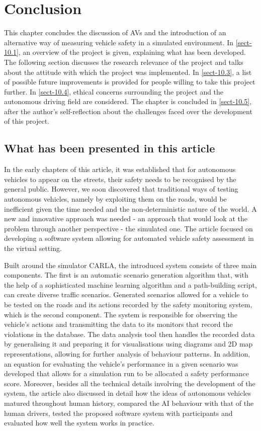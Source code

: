 \chapter{Conclusion} \label{chap:ten}
This chapter concludes the discussion of AVs and the introduction of an alternative way of measuring vehicle safety in a simulated environment. In \autoref{sect-10.1}, an overview of the project is given, explaining what has been developed. The following section discusses the research relevance of the project and talks about the attitude with which the project was implemented. In \autoref{sect-10.3}, a list of possible future improvements is provided for people willing to take this project further. In \autoref{sect-10.4}, ethical concerns surrounding the project and the autonomous driving field are considered. The chapter is concluded in \autoref{sect-10.5}, after the author's self-reflection about the challenges faced over the development of this project.

\section{What has been presented in this article} \label{sect-10.1}
In the early chapters of this article, it was established that for autonomous vehicles to appear on the streets, their safety needs to be recognised by the general public. However, we soon discovered that traditional ways of testing autonomous vehicles, namely by exploiting them on the roads, would be inefficient given the time needed and the non-deterministic nature of the world. A new and innovative approach was needed - an approach that would look at the problem through another perspective - the simulated one. The article focused on developing a software system allowing for automated vehicle safety assessment in the virtual setting. 

Built around the simulator CARLA, the introduced system consists of three main components. The first is an automatic scenario generation algorithm that, with the help of a sophisticated machine learning algorithm and a path-building script, can create diverse traffic scenarios. Generated scenarios allowed for a vehicle to be tested on the roads and its actions recorded by the safety monitoring system, which is the second component. The system is responsible for observing the vehicle's actions and transmitting the data to its monitors that record the violations in the database. The data analysis tool then handles the recorded data by generalising it and preparing it for visualisations using diagrams and 2D map representations, allowing for further analysis of behaviour patterns. In addition, an equation for evaluating the vehicle's performance in a given scenario was developed that allows for a simulation run to be allocated a safety performance score. Moreover, besides all the technical details involving the development of the system, the article also discussed in detail how the ideas of autonomous vehicles matured throughout human history, compared the AI behaviour with that of the human drivers, tested the proposed software system with participants and evaluated how well the system works in practice.

